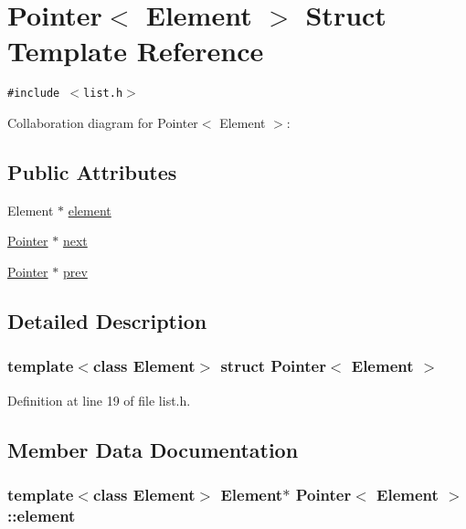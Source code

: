 \hypertarget{structPointer}{
\section{Pointer$<$ Element $>$ Struct Template Reference}
\label{structPointer}
}
{\tt \#include $<$list.h$>$}

Collaboration diagram for Pointer$<$ Element $>$:\subsection*{Public Attributes}
\begin{CompactItemize}
\item 
Element $\ast$ \hyperlink{structPointer_f741eabecc8ba3e3a655e3883a9ef18c}{element}
\item 
\hyperlink{structPointer}{Pointer} $\ast$ \hyperlink{structPointer_fc15ebf0f8711484a573fe2e3553c46a}{next}
\item 
\hyperlink{structPointer}{Pointer} $\ast$ \hyperlink{structPointer_1864db6eb6132cfa6ef211b065753c55}{prev}
\end{CompactItemize}


\subsection{Detailed Description}
\subsubsection*{template$<$class Element$>$ struct Pointer$<$ Element $>$}



Definition at line 19 of file list.h.

\subsection{Member Data Documentation}
\hypertarget{structPointer_f741eabecc8ba3e3a655e3883a9ef18c}{
\subsubsection[{element}]{\setlength{\rightskip}{0pt plus 5cm}template$<$class Element$>$ Element$\ast$ {\bf Pointer}$<$ Element $>$::{\bf element}}}
\label{structPointer_f741eabecc8ba3e3a655e3883a9ef18c}




